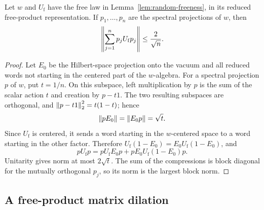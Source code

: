 \begin{lemma}\label{lem:free-compression}
Let $w$ and $U_{\mathrm f}$ have the free law in
Lemma~\ref{lem:random-freeness}, in its reduced free-product
representation. If $p_1,\ldots,p_n$ are the spectral projections of
$w$, then
\begin{equation}\label{exp:free-norm-bound}
 \left\lVert\sum_{j=1}^n p_j U_{\mathrm f}p_j\right\rVert\leq\frac2{\sqrt n}.
\end{equation}
\end{lemma}

\begin{proof}
Let $E_0$ be the Hilbert-space projection onto the vacuum and all
reduced words not starting in the centered part of the $w$-algebra.
For a spectral projection $p$ of $w$, put $t=1/n$. On this subspace,
left multiplication by $p$ is the sum of the scalar action $t$ and
creation by $p-t1$. The two resulting subspaces are orthogonal, and
$\left\lVert p-t1\right\rVert_2^2=t(1-t)$; hence
\[
 \left\lVert pE_0\right\rVert=\left\lVert E_0p\right\rVert=\sqrt{t}.
\]
Since $U_{\mathrm f}$ is centered, it sends a word starting in the
$w$-centered space to a word starting in the other factor. Therefore
$U_{\mathrm f}(1-E_0)=E_0U_{\mathrm f}(1-E_0)$, and
\[
 pU_{\mathrm f}p
 =pU_{\mathrm f}E_0p+pE_0U_{\mathrm f}(1-E_0)p.
\]
Unitarity gives norm at most $2\sqrt t$. The sum of the compressions
is block diagonal for the mutually orthogonal $p_j$, so its norm is
the largest block norm.
\end{proof}

\subsection{A free-product matrix dilation}

